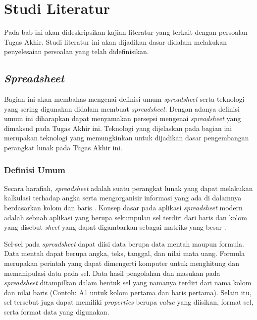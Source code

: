 \chapter{Studi Literatur}

Pada bab ini akan dideskripsikan kajian literatur yang terkait dengan persoalan Tugas Akhir. Studi literatur ini akan dijadikan dasar didalam melakukan penyelesaian persoalan yang telah didefinisikan.

\section{\textit{Spreadsheet}}
Bagian ini akan membahas mengenai definisi umum \textit{spreadsheet} serta teknologi yang sering digunakan didalam membuat \textit{spreadsheet}. Dengan adanya definisi umum ini diharapkan dapat menyamakan persepsi mengenai \textit{spreadsheet} yang dimaksud pada Tugas Akhir ini. Teknologi yang dijelaskan pada bagian ini merupakan teknologi yang memungkinkan untuk dijadikan dasar pengembangan perangkat lunak pada Tugas Akhir ini.

\subsection{Definisi Umum}
Secara harafiah, \textit{spreadsheet} adalah suatu perangkat lunak yang dapat melakukan kalkulasi terhadap angka serta mengorganisir informasi yang ada di dalamnya berdasarkan kolom dan baris \citep{meriamwebster-spreadsheet}. Konsep dasar pada aplikasi \textit{spreadsheet} modern adalah sebuah aplikasi yang berupa sekumpulan sel terdiri dari baris dan kolom yang disebut \textit{sheet} yang dapat digambarkan sebagai matriks yang besar \citep{Ronen1989}.

Sel-sel pada \textit{spreadsheet} dapat diisi data berupa data mentah maupun formula. Data mentah dapat berupa angka, teks, tanggal, dan nilai mata uang. Formula merupakan perintah yang dapat dimengerti komputer untuk menghitung dan memanipulasi data pada sel. Data hasil pengolahan dan masukan pada \textit{spreadsheet} ditampilkan dalam bentuk sel yang namanya terdiri dari nama kolom dan nilai baris (Contoh: A1 untuk kolom pertama dan baris pertama). Selain itu, sel tersebut juga dapat memiliki \textit{properties} berupa \textit{value} yang diisikan, format sel, serta format data yang digunakan.

